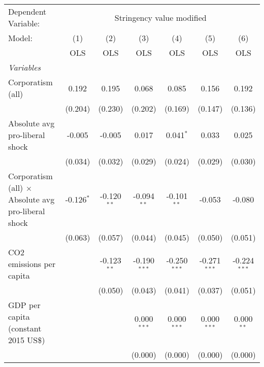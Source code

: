 
\begingroup
\centering
\begin{tabular}{lcccccc}
   \toprule
   Dependent Variable: & \multicolumn{6}{c}{Stringency value modified}\\
   Model:                                                     & (1)          & (2)           & (3)            & (4)            & (5)            & (6)\\  
                                                              &  OLS         & OLS           & OLS            & OLS            & OLS            & OLS\\  
   \midrule
   \emph{Variables}\\
   Corporatism (all)                                          & 0.192        & 0.195         & 0.068          & 0.085          & 0.156          & 0.192\\   
                                                              & (0.204)      & (0.230)       & (0.202)        & (0.169)        & (0.147)        & (0.136)\\   
   Absolute avg pro-liberal shock                             & -0.005       & -0.005        & 0.017          & 0.041$^{*}$    & 0.033          & 0.025\\   
                                                              & (0.034)      & (0.032)       & (0.029)        & (0.024)        & (0.029)        & (0.030)\\   
   Corporatism (all) $\times$ Absolute avg pro-liberal shock  & -0.126$^{*}$ & -0.120$^{**}$ & -0.094$^{**}$  & -0.101$^{**}$  & -0.053         & -0.080\\   
                                                              & (0.063)      & (0.057)       & (0.044)        & (0.045)        & (0.050)        & (0.051)\\   
   CO2 emissions per capita                                   &              & -0.123$^{**}$ & -0.190$^{***}$ & -0.250$^{***}$ & -0.271$^{***}$ & -0.224$^{***}$\\   
                                                              &              & (0.050)       & (0.043)        & (0.041)        & (0.037)        & (0.051)\\   
   GDP per capita (constant 2015 US\$)                        &              &               & 0.000$^{***}$  & 0.000$^{***}$  & 0.000$^{***}$  & 0.000$^{**}$\\   
                                                              &              &               & (0.000)        & (0.000)        & (0.000)        & (0.000)\\   

\end{tabular}
